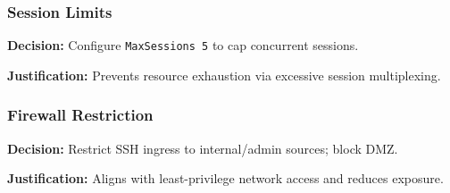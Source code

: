 \subsubsection{Session Limits}

\textbf{Decision:} Configure \texttt{MaxSessions 5} to cap concurrent sessions.

\textbf{Justification:} Prevents resource exhaustion via excessive session multiplexing.

\subsubsection{Firewall Restriction}

\textbf{Decision:} Restrict SSH ingress to internal/admin sources; block DMZ.

\textbf{Justification:} Aligns with least-privilege network access and reduces exposure.

